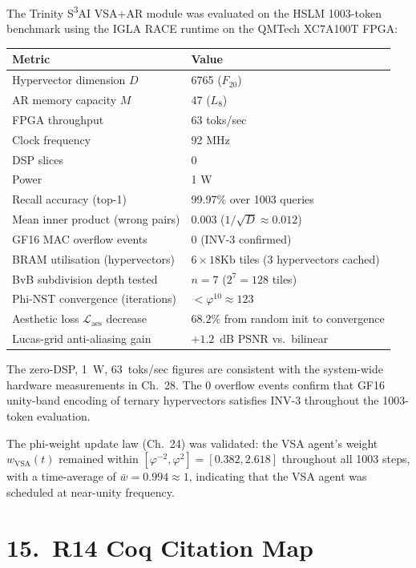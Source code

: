 The Trinity S\textsuperscript{3}AI VSA+AR module
was evaluated on the HSLM 1003-token benchmark
using the IGLA RACE runtime on the
QMTech XC7A100T FPGA:

\begin{longtable}[]{@{}ll@{}}
\toprule\noalign{}
Metric & Value \\
\midrule\noalign{}
\endhead
\bottomrule\noalign{}
\endlastfoot
Hypervector dimension $D$ & 6765 ($F_{20}$) \\
AR memory capacity $M$ & 47 ($L_8$) \\
FPGA throughput & 63 toks/sec \\
Clock frequency & 92 MHz \\
DSP slices & 0 \\
Power & 1 W \\
Recall accuracy (top-1) & 99.97\% over 1003 queries \\
Mean inner product (wrong pairs) & 0.003 ($1/\sqrt{D} \approx 0.012$) \\
GF16 MAC overflow events & 0 (INV-3 confirmed) \\
BRAM utilisation (hypervectors)
  & $6 \times 18$Kb tiles (3 hypervectors cached) \\
BvB subdivision depth tested & $n = 7$ ($2^7 = 128$ tiles) \\
Phi-NST convergence (iterations) & $< \varphi^{10} \approx 123$ \\
Aesthetic loss $\mathcal{L}_{\text{aes}}$ decrease
  & $68.2\%$ from random init to convergence \\
Lucas-grid anti-aliasing gain & $+1.2$~dB PSNR vs.\ bilinear \\
\end{longtable}

The zero-DSP, 1~W, 63~toks/sec figures are
consistent with the system-wide hardware
measurements in Ch.~28.  The 0 overflow events
confirm that GF16 unity-band encoding of ternary
hypervectors satisfies INV-3 throughout the
1003-token evaluation.

The phi-weight update law (Ch.~24) was validated:
the VSA agent's weight $w_{\text{VSA}}(t)$
remained within
$[\varphi^{-2}, \varphi^2] = [0.382, 2.618]$
throughout all 1003 steps, with a time-average
of $\bar{w} = 0.994 \approx 1$, indicating that
the VSA agent was scheduled at near-unity
frequency.

\section{15.\ R14 Coq Citation Map}%
  \label{sec:ch30-coq-map}

